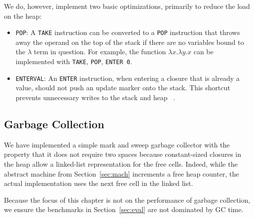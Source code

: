 We do, however, implement two basic optimizations, primarily to reduce the load
on the heap:

\begin{itemize}
\item \texttt{POP}: A \texttt{TAKE} instruction can be converted to a \texttt{POP}
instruction that throws away the operand on the top of the stack if there are no
variables bound to the $\lambda$ term in question. For example, the function
$\lambda x.\lambda y.x$ can be implemented with \texttt{TAKE}, \texttt{POP},
\texttt{ENTER 0}.  
\item \texttt{ENTERVAL}: An \texttt{ENTER} instruction, when entering a
closure that is already a value, should not push an update marker onto the
stack. This shortcut prevents unnecessary writes to the stack and heap
~\cite{jonesstg,lkm,sestoft}.  
\end{itemize}

\subsection{Garbage Collection}

We have implemented a simple mark and sweep garbage collector with the property
that it does not require two spaces because constant-sized closures in the
heap allow a linked-list representation for the free cells. Indeed,
while the abstract machine from Section~\ref{sec:mach} increments a free heap
counter, the actual implementation uses the next free cell in the linked list.

Because the focus of this chapter is not on the performance of garbage collection,
we ensure the benchmarks in Section~\ref{sec:eval} are not dominated by GC time.

